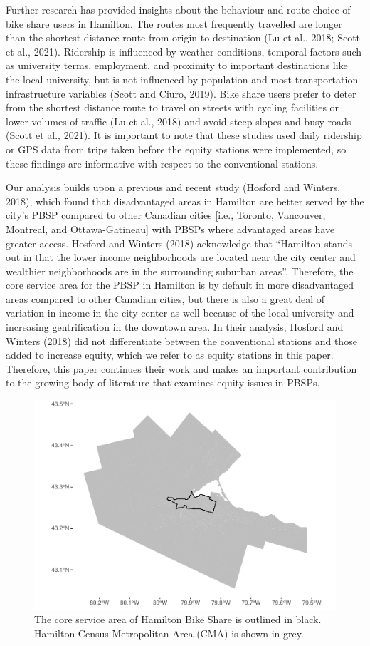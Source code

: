 \documentclass[]{elsarticle} %
\begin{document}
Further research has provided insights about the behaviour and route
choice of bike share users in Hamilton. The routes most frequently
travelled are longer than the shortest distance route from origin to
destination (Lu et al., 2018; Scott et al., 2021). Ridership is
influenced by weather conditions, temporal factors such as university
terms, employment, and proximity to important destinations like the
local university, but is not influenced by population and most
transportation infrastructure variables (Scott and Ciuro, 2019). Bike
share users prefer to deter from the shortest distance route to travel
on streets with cycling facilities or lower volumes of traffic (Lu et
al., 2018) and avoid steep slopes and busy roads (Scott et al., 2021).
It is important to note that these studies used daily ridership or GPS
data from trips taken before the equity stations were implemented, so
these findings are informative with respect to the conventional
stations.

Our analysis builds upon a previous and recent study (Hosford and
Winters, 2018), which found that disadvantaged areas in Hamilton are
better served by the city's PBSP compared to other Canadian cities
{[}i.e., Toronto, Vancouver, Montreal, and Ottawa-Gatineau{]} with PBSPs
where advantaged areas have greater access. Hosford and Winters (2018)
acknowledge that ``Hamilton stands out in that the lower income
neighborhoods are located near the city center and wealthier
neighborhoods are in the surrounding suburban areas''. Therefore, the
core service area for the PBSP in Hamilton is by default in more
disadvantaged areas compared to other Canadian cities, but there is also
a great deal of variation in income in the city center as well because
of the local university and increasing gentrification in the downtown
area. In their analysis, Hosford and Winters (2018) did not
differentiate between the conventional stations and those added to
increase equity, which we refer to as equity stations in this paper.
Therefore, this paper continues their work and makes an important
contribution to the growing body of literature that examines equity
issues in PBSPs.

\begin{figure}

{\centering \includegraphics[width=0.65\linewidth]{Bike-share-spatial-equity_files/figure-latex/hamilton-and-sobi-service-area-1} 

}

\caption{The core service area of Hamilton Bike Share is outlined in black. Hamilton Census Metropolitan Area (CMA) is shown in grey.}\label{fig:hamilton-and-sobi-service-area}
\end{figure}
\end{document}
